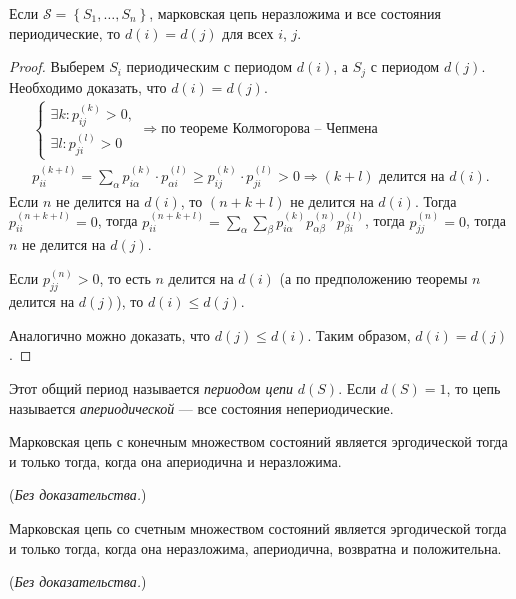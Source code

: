 \begin{theorem}
  Если $\mathscr S = \left\{ S_1, \dots, S_n \right\} $, марковская цепь неразложима и все состояния
  периодические, то $d(i) = d(j)$ для всех $ i $, $ j $.
\end{theorem}
\begin{proof}
  Выберем $S_i$ периодическим с периодом $d(i)$, а $S_j$ с периодом $d(j)$.
  Необходимо доказать, что $d(i) = d(j)$.
  \begin{multline*}
    \begin{cases}
    \exists k \colon p_{ij}^{(k)} > 0, \\
    \exists l \colon p_{ji}^{(l)} > 0
    \end{cases}
    \Rightarrow \text{по теореме Колмогорова -- Чепмена } \\
    p_{ii}^{(k+l)} = \sum_{\alpha} p_{i\alpha}^{(k)} \cdot p_{\alpha i}^{(l)} 
    \geqslant p_{ij}^{(k)} \cdot p_{ji}^{(l)} > 0
    \Rightarrow
    (k+l) \text{ делится на $d(i)$}.
  \end{multline*}
  Если $n$ не делится на $d(i)$, то $(n+k+l)$ не делится на $d(i)$. Тогда $p_{ii}^{(n+k+l)} = 0$, 
  тогда $p_{ii}^{(n+k+l)} = \sum\limits_{\alpha} \sum\limits_\beta p_{i\alpha}^{(k)} p_{\alpha \beta}^{(n)} 
  p_{\beta i}^{(l)}$, тогда $p_{jj}^{(n)} = 0$, тогда $n$ не делится на $d(j)$.

  Если $p_{jj}^{(n)} > 0 $, то есть $n$ делится на $d(i)$ (а по предположению теоремы $n$ делится 
  на $d(j)$), то $d(i) \leqslant d(j)$.

  Аналогично можно доказать, что $d(j) \leqslant d(i)$. Таким образом, $d(i) = d(j)$.
\end{proof}

\begin{definition}
  Этот общий период называется \emph{периодом цепи} $d(S)$.
  Если $d(S) = 1$, то цепь называется \emph{апериодической} --- все состояния непериодические.
\end{definition}

\begin{theorem}
  Марковская цепь с конечным множеством состояний является эргодической тогда и только тогда,
  когда она апериодична и неразложима.
\end{theorem}
(\emph{Без доказательства.})

\begin{theorem}
  Марковская цепь со счетным множеством состояний является эргодической тогда и только тогда,
  когда она неразложима, апериодична, возвратна и положительна.
\end{theorem}
(\emph{Без доказательства.})

